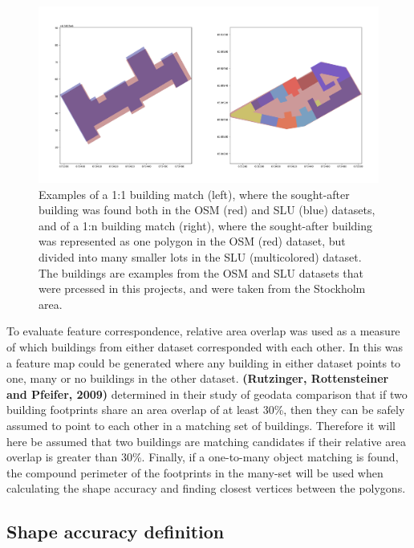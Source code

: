 \documentclass{kththesis}
\begin{document}
\begin{figure}[H]
    \centering
    \includegraphics[width=\textwidth,height=0.5\textheight,keepaspectratio]{img_building_match}
    \caption{Examples of a 1:1 building match (left), where the sought-after building was found both in the OSM (red) and SLU (blue) datasets, and of a 1:n building match (right), where the sought-after building was represented as one polygon in the OSM (red) dataset, but divided into many smaller lots in the SLU (multicolored) dataset. The buildings are examples from the OSM and SLU datasets that were prcessed in this projects, and were taken from the Stockholm area.}
    \label{fig:building-match-types}
\end{figure}

To evaluate feature correspondence, relative area overlap was used as a measure of which buildings from either dataset corresponded with each other.
In this was a feature map could be generated where any building in either dataset points to one, many or no buildings in the other dataset.
\textbf{(Rutzinger, Rottensteiner and Pfeifer, 2009)} determined in their study of geodata comparison that if two building footprints share an area overlap of at least 30\%, then they can be safely assumed to point to each other in a matching set of buildings.
Therefore it will here be assumed that two buildings are matching candidates if their relative area overlap is greater than 30\%.
Finally, if a one-to-many object matching is found, the compound perimeter of the footprints in the many-set will be used when calculating the shape accuracy and finding closest vertices between the polygons.

\subsection{Shape accuracy definition}
\end{document}
